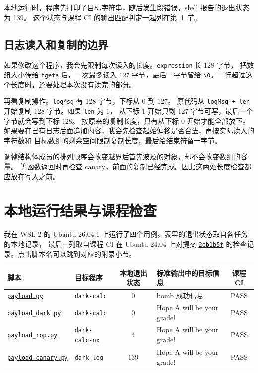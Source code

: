 \documentclass[UTF8,a4paper,12pt,fontset=windows]{ctexart}
\newcommand{\code}[1]{\texttt{#1}}
\begin{document}
本地运行时，程序先打印了目标字符串，随后发生段错误，shell 报告的退出状态为 139。
这个状态与课程 CI 的输出匹配判定一起列在第~\ref{sec:results}~节。

\subsection{日志读入和复制的边界}

如果修改这个程序，我会先限制每次读入的长度。\code{expression} 长 128 字节，
把数组大小传给 \code{fgets} 后，一次最多读入 127 字节，最后一字节留给
\code{\textbackslash 0}。一行超过这个长度时，还要处理本次没有读完的部分。

再看复制操作。\code{logMsg} 有 128 字节，下标从 0 到 127。
原代码从 \code{logMsg + len} 开始复制 128 字节。如果 \code{len} 为 1，
从下标 1 开始只剩 127 字节可写，最后一个字节就会写到下标 128。
按原来的复制长度，只有从下标 0 开始才能全部放下。
如果要在已有日志后面追加内容，我会先检查起始偏移是否合法，再按实际读入的字符数和
目标数组的剩余空间限制复制长度，最后给结束符留一字节。

调整结构体成员的排列顺序会改变越界后首先波及的对象，却不会改变数组的容量。
等函数返回时再检查 canary，前面的复制已经完成。因此这两处长度检查都应放在写入之前。

\section{本地运行结果与课程检查}
\label{sec:results}

我在 WSL 2 的 Ubuntu 26.04.1 上运行了四个用例。表里的退出状态取自各任务的本地记录，
最后一列取自课程 CI 在 Ubuntu 24.04 上对提交 \href{https://github.com/wuxiangjie84/ics-2026-attacklab/actions/runs/42976239526}{\code{2cb1b5f}} 的检查记录。点击脚本名可以跳到对应的附录小节。

\begin{center}
\small
\begin{tabular}{|l|l|c|p{4.4cm}|c|}
\hline
脚本 & 目标程序 & 本地退出状态 & 标准输出中的目标信息 & 课程 CI \\
\hline
\hyperref[app:one]{\code{payload.py}} & \code{dark-calc} & 0 &
  bomb 成功信息 & PASS \\
\hline
\hyperref[app:two]{\code{payload\_dark.py}} & \code{dark-calc} & 0 &
  Hope A will be your grade! & PASS \\
\hline
\hyperref[app:three]{\code{payload\_rop.py}} & \code{dark-calc-nx} & 4 &
  Hope A will be your grade! & PASS \\
\hline
\hyperref[app:four]{\code{payload\_canary.py}} & \code{dark-log} & 139 &
  Hope A will be your grade! & PASS \\
\hline
\end{tabular}
\end{center}
\end{document}
